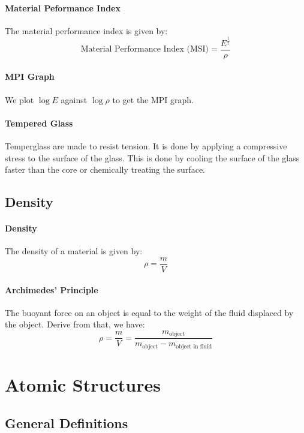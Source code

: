 \documentclass[11pt]{article}
\begin{document}
\paragraph{Material Peformance Index} The material performance index is given by:
    \begin{equation}
        \text{Material Performance Index (MSI)} = \frac{E^\frac{1}{2}}{\rho}
\end{equation}
\paragraph{MPI Graph} We plot $\log E$ against $\log \rho$ to get the MPI graph. 
\paragraph{Tempered Glass} Temperglass are made to resist tension. It is done by applying a compressive stress to the surface of the glass. This is done by cooling the surface of the glass faster than the core or chemically treating the surface.
\subsection{Density}
\paragraph{Density} The density of a material is given by:
\begin{equation}
    \rho = \frac{m}{V}
\end{equation}
\paragraph{Archimedes' Principle} The buoyant force on an object is equal to the weight of the fluid displaced by the object. Derive from that, we have:
\begin{equation}
    \rho = \frac{m}{V} = \frac{m_{\text{object}}}{m_{\text{object}} - m_{\text{object in fluid}}}
\end{equation}
\section{Atomic Structures}
\subsection{General Definitions}
\end{document}
